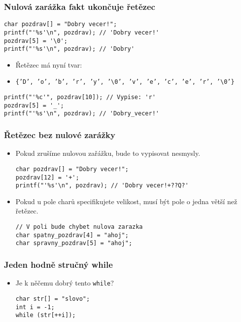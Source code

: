 \documentclass{beamer}
\newenvironment{itemizex}%
  {\large \begin{itemize}%
    \setlength{\itemsep}{8pt}%
    \setlength{\parskip}{8pt}}%
  {\end{itemize}}
\begin{document}
\begin{frame}[t,fragile]\frametitle{Nulová zarážka fakt ukončuje řetězec} 
    \begin{verbatim} 
char pozdrav[] = "Dobry vecer!";
printf("'%s'\n", pozdrav); // 'Dobry vecer!'
pozdrav[5] = '\0';
printf("'%s'\n", pozdrav); // 'Dobry'
    \end{verbatim}
    \begin{itemizex}
        \item Řetězec má nyní tvar:
        \item \texttt{\{'D', 'o', 'b', 'r', 'y', '\textbackslash0', 'v', 'e', 'c', 'e', 'r', '\textbackslash0'\}}
    \end{itemizex}
    \begin{verbatim} 
printf("'%c'", pozdrav[10]); // Vypise: 'r'
pozdrav[5] = '_';
printf("'%s'\n", pozdrav); // 'Dobry_vecer!'
    \end{verbatim}
\end{frame}


\begin{frame}[t,fragile]\frametitle{Řetězec bez nulové zarážky} 
    \begin{itemizex}
        \item Pokud zrušíme nulovou zařážku, bude to vypisovat nesmysly.
        \begin{verbatim} 
char pozdrav[] = "Dobry vecer!";
pozdrav[12] = '+';
printf("'%s'\n", pozdrav); // 'Dobry vecer!+??Q?'
        \end{verbatim}
        \item Pokud u pole charů specifikujete velikost, musí být pole o jedna větší než řetězec.
        \begin{verbatim} 
// V poli bude chybet nulova zarazka
char spatny_pozdrav[4] = "ahoj"; 
char spravny_pozdrav[5] = "ahoj";
        \end{verbatim}
    \end{itemizex}
\end{frame}


\begin{frame}[t,fragile]\frametitle{Jeden hodně stručný while} 
    \begin{itemizex}
        \item Je k něčemu dobrý tento \texttt{while}?
        \begin{verbatim} 
char str[] = "slovo";
int i = -1;
while (str[++i]);
    \end{verbatim}
    \end{itemizex}
\end{frame}
\end{document}
